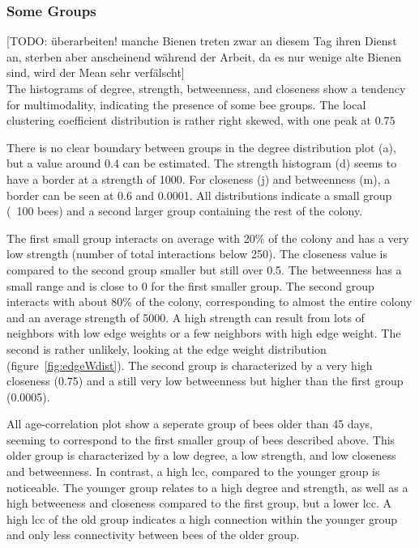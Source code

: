 \subsubsection{Some Groups}
[TODO: überarbeiten! manche Bienen treten zwar an diesem Tag ihren Dienst an, sterben aber anscheinend während der Arbeit, da es nur wenige alte Bienen sind, wird der Mean sehr verfälscht]\\

The histograms of degree, strength, betweenness, and closeness show a tendency for multimodality, indicating the presence of some bee groups. The local clustering coefficient distribution is rather right skewed, with one peak at $0.75$

There is no clear boundary between groups in the degree distribution plot (a), but a value around 0.4 can be estimated.
The strength histogram (d) seems to have a border at a strength of 1000.
For closeness (j) and betweenness (m), a border can be seen at 0.6 and 0.0001.
All distributions indicate a small group (~100 bees) and a second larger group containing the rest of the colony.

The first small group interacts on average with 20\% of the colony and has a very low strength (number of total interactions below 250). The closeness value is compared to the second group smaller but still over 0.5. The betweenness has a small range and is close to 0 for the first smaller group.
The second group interacts with about 80\% of the colony, corresponding to almost the entire colony and an average strength of 5000. A high strength can result from lots of neighbors with low edge weights or a few neighbors with high edge weight. The second is rather unlikely, looking at the edge weight distribution (figure~\ref{fig:edgeWdist}). The second group is characterized by a very high closeness (0.75) and a still very low betweenness but higher than the first group (0.0005).

All age-correlation plot show a seperate group of bees older than 45 days, seeming to correspond to the first smaller group of bees described above.
This older group is characterized by a low degree, a low strength, and low closeness and betweenness. In contrast, a high lcc, compared to the younger group is noticeable.
The younger group relates to a high degree and strength, as well as a high betweeness and closeness compared to the first group, but a lower lcc.
A high lcc of the old group indicates a high connection within the younger group and only less connectivity between bees of the older group.


